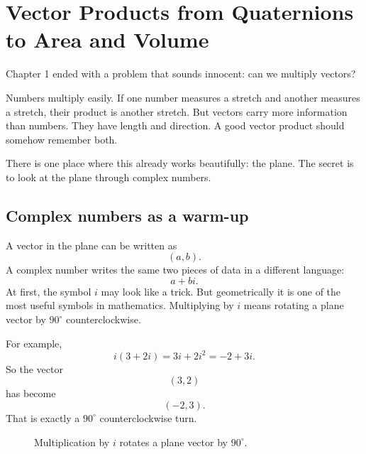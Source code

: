 
\chapter{Vector Products from Quaternions to Area and Volume}
\label{ch:2}
Chapter 1 ended with a problem that sounds innocent: can we multiply vectors?

Numbers multiply easily.  If one number measures a stretch and another measures a
stretch, their product is another stretch.  But vectors carry more information than numbers.
They have length and direction.  A good vector product should somehow remember both.

There is one place where this already works beautifully: the plane.  The secret is to look
at the plane through complex numbers.

\section{Complex numbers as a warm-up}

A vector in the plane can be written as
\[
    (a,b).
\]
A complex number writes the same two pieces of data in a different language:
\[
    a+bi.
\]
At first, the symbol \(i\) may look like a trick.  But geometrically it is one of the most
useful symbols in mathematics.  Multiplying by \(i\) means rotating a plane vector by
\(90^\circ\) counterclockwise.

For example,
\[
    i(3+2i)=3i+2i^2=-2+3i.
\]
So the vector
\[
    (3,2)
\]
has become
\[
    (-2,3).
\]
That is exactly a \(90^\circ\) counterclockwise turn.

\begin{figure}[h]
\centering
{}
\caption{Multiplication by \(i\) rotates a plane vector by \(90^\circ\).}
\end{figure}

